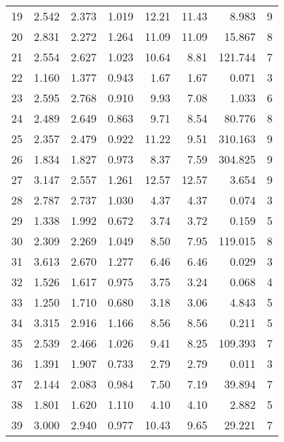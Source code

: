 \begin{tabular}{lrrrrrrr}
19 &     2.542 &      2.373 &      1.019 &   12.21 &    11.43 &    8.983 &        9 \\
20 &     2.831 &      2.272 &      1.264 &   11.09 &    11.09 &   15.867 &        8 \\
21 &     2.554 &      2.627 &      1.023 &   10.64 &     8.81 &  121.744 &        7 \\
22 &     1.160 &      1.377 &      0.943 &    1.67 &     1.67 &    0.071 &        3 \\
23 &     2.595 &      2.768 &      0.910 &    9.93 &     7.08 &    1.033 &        6 \\
24 &     2.489 &      2.649 &      0.863 &    9.71 &     8.54 &   80.776 &        8 \\
25 &     2.357 &      2.479 &      0.922 &   11.22 &     9.51 &  310.163 &        9 \\
26 &     1.834 &      1.827 &      0.973 &    8.37 &     7.59 &  304.825 &        9 \\
27 &     3.147 &      2.557 &      1.261 &   12.57 &    12.57 &    3.654 &        9 \\
28 &     2.787 &      2.737 &      1.030 &    4.37 &     4.37 &    0.074 &        3 \\
29 &     1.338 &      1.992 &      0.672 &    3.74 &     3.72 &    0.159 &        5 \\
30 &     2.309 &      2.269 &      1.049 &    8.50 &     7.95 &  119.015 &        8 \\
31 &     3.613 &      2.670 &      1.277 &    6.46 &     6.46 &    0.029 &        3 \\
32 &     1.526 &      1.617 &      0.975 &    3.75 &     3.24 &    0.068 &        4 \\
33 &     1.250 &      1.710 &      0.680 &    3.18 &     3.06 &    4.843 &        5 \\
34 &     3.315 &      2.916 &      1.166 &    8.56 &     8.56 &    0.211 &        5 \\
35 &     2.539 &      2.466 &      1.026 &    9.41 &     8.25 &  109.393 &        7 \\
36 &     1.391 &      1.907 &      0.733 &    2.79 &     2.79 &    0.011 &        3 \\
37 &     2.144 &      2.083 &      0.984 &    7.50 &     7.19 &   39.894 &        7 \\
38 &     1.801 &      1.620 &      1.110 &    4.10 &     4.10 &    2.882 &        5 \\
39 &     3.000 &      2.940 &      0.977 &   10.43 &     9.65 &   29.221 &        7 \\

\end{tabular}
